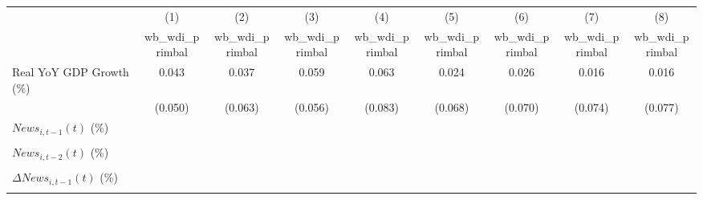{
\def\sym#1{\ifmmode^{#1}\else\(^{#1}\)\fi}
\begin{tabular}{l*{8}{c}}
\toprule
                    &\multicolumn{1}{c}{(1)}&\multicolumn{1}{c}{(2)}&\multicolumn{1}{c}{(3)}&\multicolumn{1}{c}{(4)}&\multicolumn{1}{c}{(5)}&\multicolumn{1}{c}{(6)}&\multicolumn{1}{c}{(7)}&\multicolumn{1}{c}{(8)}\\
                    &\multicolumn{1}{c}{wb_wdi_primbal}&\multicolumn{1}{c}{wb_wdi_primbal}&\multicolumn{1}{c}{wb_wdi_primbal}&\multicolumn{1}{c}{wb_wdi_primbal}&\multicolumn{1}{c}{wb_wdi_primbal}&\multicolumn{1}{c}{wb_wdi_primbal}&\multicolumn{1}{c}{wb_wdi_primbal}&\multicolumn{1}{c}{wb_wdi_primbal}\\
\midrule
Real YoY GDP Growth (\%)&       0.043         &       0.037         &       0.059         &       0.063         &       0.024         &       0.026         &       0.016         &       0.016         \\
                    &     (0.050)         &     (0.063)         &     (0.056)         &     (0.083)         &     (0.068)         &     (0.070)         &     (0.074)         &     (0.077)         \\
\addlinespace
$ News_{i,t-1}(t)$ (\%)&                     &                     &                     &                     &                     &                     &                     &                     \\
                    &                     &                     &                     &                     &                     &                     &                     &                     \\
\addlinespace
$ News_{i,t-2}(t)$ (\%)&                     &                     &                     &                     &                     &                     &                     &                     \\
                    &                     &                     &                     &                     &                     &                     &                     &                     \\
\addlinespace
$ \Delta News_{i,t-1}(t)$ (\%)&                     &                     &                     &                     &                     &                     &                     &                     \\
                    &                     &                     &                     &                     &                     &                     &                     &                     \\

\end{tabular}}
